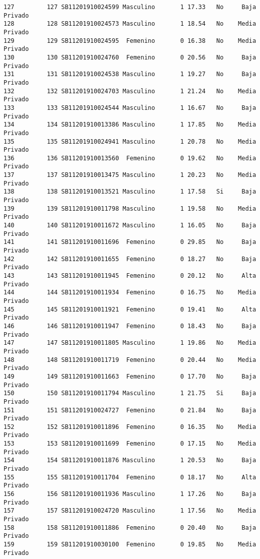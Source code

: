 \documentclass[
  letterpaper,
  DIV=11,
  numbers=noendperiod]{scrartcl}
\begin{document}
\begin{verbatim}
127         127 SB11201910024599 Masculino       1 17.33   No     Baja Privado
128         128 SB11201910024573 Masculino       1 18.54   No    Media Privado
129         129 SB11201910024595  Femenino       0 16.38   No    Media Privado
130         130 SB11201910024760  Femenino       0 20.56   No     Baja Privado
131         131 SB11201910024538 Masculino       1 19.27   No     Baja Privado
132         132 SB11201910024703 Masculino       1 21.24   No    Media Privado
133         133 SB11201910024544 Masculino       1 16.67   No     Baja Privado
134         134 SB11201910013386 Masculino       1 17.85   No    Media Privado
135         135 SB11201910024941 Masculino       1 20.78   No    Media Privado
136         136 SB11201910013560  Femenino       0 19.62   No    Media Privado
137         137 SB11201910013475 Masculino       1 20.23   No    Media Privado
138         138 SB11201910013521 Masculino       1 17.58   Si     Baja Privado
139         139 SB11201910011798 Masculino       1 19.58   No    Media Privado
140         140 SB11201910011672 Masculino       1 16.05   No     Baja Privado
141         141 SB11201910011696  Femenino       0 29.85   No     Baja Privado
142         142 SB11201910011655  Femenino       0 18.27   No     Baja Privado
143         143 SB11201910011945  Femenino       0 20.12   No     Alta Privado
144         144 SB11201910011934  Femenino       0 16.75   No    Media Privado
145         145 SB11201910011921  Femenino       0 19.41   No     Alta Privado
146         146 SB11201910011947  Femenino       0 18.43   No     Baja Privado
147         147 SB11201910011805 Masculino       1 19.86   No    Media Privado
148         148 SB11201910011719  Femenino       0 20.44   No    Media Privado
149         149 SB11201910011663  Femenino       0 17.70   No     Baja Privado
150         150 SB11201910011794 Masculino       1 21.75   Si     Baja Privado
151         151 SB11201910024727  Femenino       0 21.84   No     Baja Privado
152         152 SB11201910011896  Femenino       0 16.35   No    Media Privado
153         153 SB11201910011699  Femenino       0 17.15   No    Media Privado
154         154 SB11201910011876 Masculino       1 20.53   No     Baja Privado
155         155 SB11201910011704  Femenino       0 18.17   No     Alta Privado
156         156 SB11201910011936 Masculino       1 17.26   No     Baja Privado
157         157 SB11201910024720 Masculino       1 17.56   No    Media Privado
158         158 SB11201910011886  Femenino       0 20.40   No     Baja Privado
159         159 SB11201910030100  Femenino       0 19.85   No    Media Privado

\end{verbatim}
\end{document}
